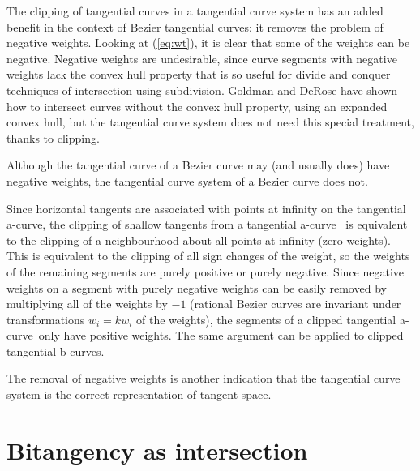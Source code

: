 \documentclass[12pt]{article}
\newcommand{\atang}{tangential a-curve\ }
\begin{document}

The clipping of tangential curves in a tangential curve system
has an added benefit in the context of Bezier tangential curves: 
it removes the problem of negative weights.
Looking at (\ref{eq:wt}),
it is clear that some of the weights can be negative.
Negative weights are undesirable, 
since curve segments with negative weights
lack the convex hull property that is so useful for divide and conquer
techniques of intersection using subdivision.
Goldman and DeRose \cite{goldman86} have shown how to intersect curves without
the convex hull property, using an expanded convex hull,
but the tangential curve system does not need this special treatment,
thanks to clipping.

\begin{lemma}
Although the tangential curve of a Bezier curve may (and usually does) have
negative weights,
the tangential curve system of a Bezier curve does not.
\end{lemma}
\prf
Since horizontal tangents are associated with points at infinity on the
tangential a-curve, the clipping of shallow tangents from a \atang 
is equivalent to the clipping 
of a neighbourhood about all points at infinity (zero weights).
This is equivalent to the clipping of all sign changes of the weight,
so the weights of the remaining segments are purely positive or purely negative.  
Since negative weights on a segment with purely negative weights can be easily
removed by multiplying all of the weights by $-1$ (rational Bezier curves 
are invariant under transformations $w_i = kw_i$ of the weights),
the segments of a clipped \atang only have positive weights.
The same argument can be applied to clipped tangential b-curves.
\QED

The removal of negative weights is another indication that the tangential curve
system is the correct representation of tangent space.


\section{Bitangency as intersection}
\label{sec:bitang}
\end{document}
